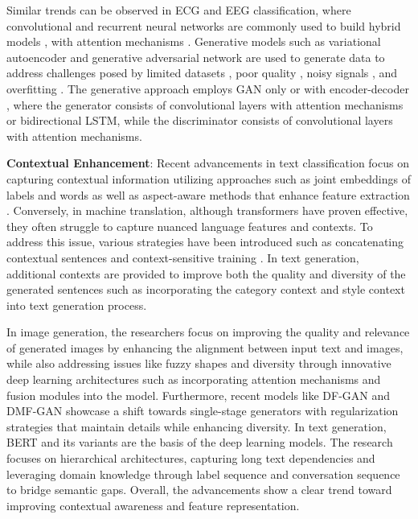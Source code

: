 \documentclass[preprint,12pt]{elsarticle}
\begin{document}
Similar trends can be observed in ECG and EEG classification, where convolutional and recurrent neural networks are commonly used to build hybrid models \citep{alamatsaz_lightweight_2024, hermawan_multi_2024}, with attention mechanisms \citep{sun_arrhythmia_2024, chen_automated_2022}. Generative models such as variational autoencoder \citep{ dai2019eeg} and generative adversarial network are used to generate data to address challenges posed by limited datasets \citep{yang_data_2024, msigwa_iot-driven_2024, song_eeggan-net_2024}, poor quality \citep{corley_deep_2025}, noisy signals \citep{cai_dhct-gan_2025}, and overfitting \citep{zhu_electrocardiogram_2019}. The generative approach employs GAN only or with encoder-decoder \citep{yang_data_2024}, where the generator consists of convolutional layers with attention mechanisms or bidirectional LSTM, while the discriminator consists of convolutional layers with attention mechanisms.

\textbf{Contextual Enhancement}: Recent advancements in text classification focus on capturing contextual information utilizing approaches such as joint embeddings of labels \citep{wang_joint_2018} and words as well as aspect-aware methods that enhance feature extraction \citep{zhu_bert-based_2023}. Conversely, in machine translation, although transformers have proven effective, they often struggle to capture nuanced language features and contexts. To address this issue, various strategies have been introduced such as concatenating contextual sentences and context-sensitive training \citep{wu_study_2022, kim_towards_2023}. In text generation, additional contexts are provided to improve both the quality and diversity of the generated sentences such as incorporating the category context \citep{li_feature-aware_2023} and style context \citep{kwon_class_2024} into text generation process.

In image generation, the researchers focus on improving the quality and relevance of generated images by enhancing the alignment between input text and images, while also addressing issues like fuzzy shapes and diversity through innovative deep learning architectures such as incorporating attention mechanisms and fusion modules into the model. Furthermore, recent models like DF-GAN \citep{tao_df-gan_2022} and DMF-GAN \citep{yang_dmf-gan_2024} showcase a shift towards single-stage generators with regularization strategies that maintain details while enhancing diversity. In text generation, BERT and its variants are the basis of the deep learning models. The research focuses on hierarchical architectures, capturing long text dependencies \citep{ma_t-bertsum_2021} and leveraging domain knowledge through label sequence \citep{xie_pre-trained_2022} and conversation sequence \citep{li_incremental_2019} to bridge semantic gaps. Overall, the advancements show a clear trend toward improving contextual awareness and feature representation.
\end{document}
